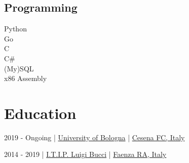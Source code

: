 \documentclass{article}
\begin{document}
\begin{paracol}{2}
\begin{tcolorbox}[colback=white]
    \subsection*{Programming}
     Python \\[4pt]
     Go \\[4pt]
     C \\[4pt]
     C\# \\[4pt]
     (My)SQL \\[4pt]
     x86 Assembly \\[80pt]

    \vspace{30pt}
\end{tcolorbox}

\switchcolumn

\maketitle
\center

%
%

\vfill

\section*{ Education}

\begin{tcolorbox}[
    title=\href{
        https://corsi.unibo.it/1cycle/ComputerScienceEngineering
    }{
        \emoji{open-book} Bachelor in Computer Science and Engineering
    },
    colback=white
]
     2019 - Ongoing \hfill | \hfill
    \href{https://www.unibo.it/en/}{ University of Bologna} \hfill | \hfill
    \href{https://www.openstreetmap.org/relation/9713588}{ Cesena FC, Italy}
\end{tcolorbox}

\begin{tcolorbox}[title=\emoji{closed-book} High School Diploma in Information Technology,colback=white]
     2014 - 2019 \hfill | \hfill
    \href{https://www.itipfaenza.edu.it/}{ I.T.I.P. Luigi Bucci} \hfill | \hfill
    \href{https://www.openstreetmap.org/relation/2227656}{ Faenza RA, Italy}
\end{tcolorbox}


\end{paracol}
\end{document}
